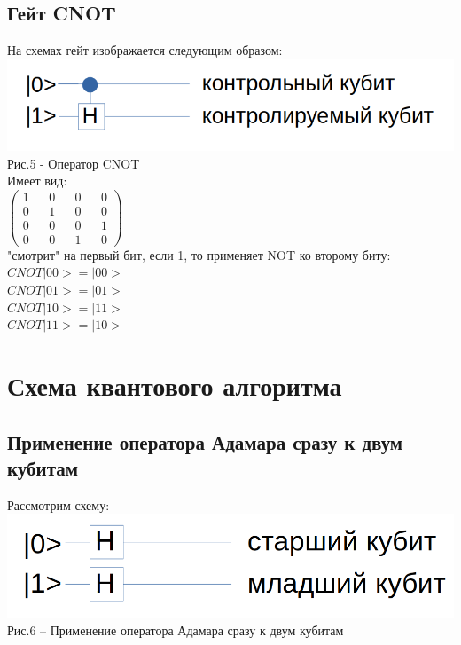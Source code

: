 \documentclass[11pt]{report}
\begin{document}
\subsection{Гейт CNOT}
На схемах гейт изображается следующим образом: \\

\includegraphics[scale=0.3]{cnot}\\
Рис.5 - Оператор CNOT\\

Имеет вид:\\

$
\begin{pmatrix}
1 && 0 && 0 && 0 \\
0 && 1 && 0 && 0 \\
0 && 0 && 0 && 1  \\
0 && 0 && 1 && 0
\end{pmatrix}
$ \\

"смотрит" на первый бит, если 1, то применяет NOT ко второму биту: \\

$CNOT|00>=|00>$ \\

$CNOT|01>=|01>$ \\

$CNOT|10>=|11>$ \\

$CNOT|11>=|10>$ \\


\section{Схема квантового алгоритма}
\subsection{Применение оператора Адамара сразу к двум кубитам} 
Рассмотрим схему: \\

\includegraphics[scale=0.2]{shema}\\
Рис.6 -- Применение оператора Адамара сразу к двум кубитам\\
\end{document}
